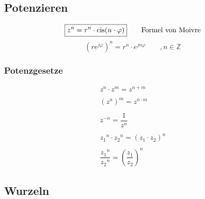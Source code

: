 
\subsection{Potenzieren}
\[ \boxed{z^n = r^n \cdot \operatorname{cis}(n \cdot \varphi)} 
\qquad \text{Formel von Moivre} \]
\[ \boxed{\left( r e^{j \varphi} \right)^n = r^n \cdot e^{j n \varphi} 
\qquad , n \in \mathbb{Z}} \]

\subsubsection{Potenzgesetze}
\[ \boxed{\begin{array}{l}
z^n \cdot z^m = z^{n +m}\\\\
{(z^n)}^m = z^{n \cdot m}\\\\
z^{-n} = \dfrac{1}{z^n}\\\\
{z_1}^n \cdot {z_2}^n = (z_1 \cdot z_2)^n\\\\
\dfrac{{z_1}^n}{{z_2}^n} = \left(\dfrac{z_1}{z_2}\right)^n
\end{array}} \]

\subsection{Wurzeln}

